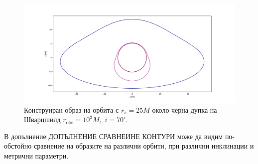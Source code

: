 \begin{figure}[h]
	\centering
	\includegraphics[scale = 0.3]{Schw_70_deg_r25.png}
	\caption[Конструиран образ на орбита с $r_s = 25M$ около черна дупка на Шварцшилд.]{\small Конструиран образ на орбита с $r_s = 25M$ около черна дупка на Шварцшилд $r_\text{obs} = 10^3M,\,\,i = 70^\circ$.} 
	\label{Scw_r25_orbit}
\end{figure}

В допълнение ДОПЪЛНЕНИЕ СРАВНЕИНЕ КОНТУРИ може да видим по-обстойно сравнение на образите на различни орбити, при различни инклинации и метрични параметри.
\newpage

